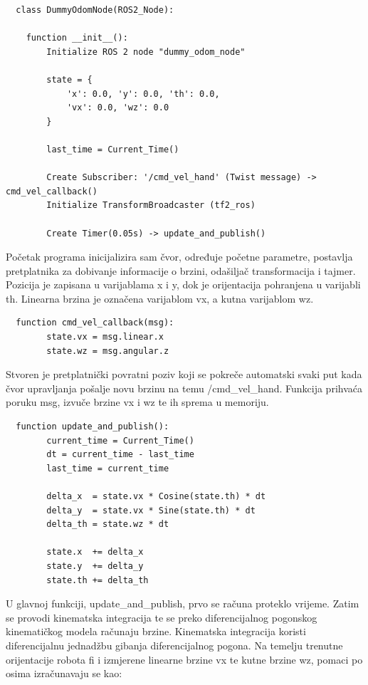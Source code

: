\documentclass[12pt,a4paper,oneside]{report}
\begin{document}
\begin{verbatim}
  class DummyOdomNode(ROS2_Node):

    function __init__():
        Initialize ROS 2 node "dummy_odom_node"

        state = {
            'x': 0.0, 'y': 0.0, 'th': 0.0,
            'vx': 0.0, 'wz': 0.0
        }

        last_time = Current_Time()

        Create Subscriber: '/cmd_vel_hand' (Twist message) -> cmd_vel_callback()
        Initialize TransformBroadcaster (tf2_ros)

        Create Timer(0.05s) -> update_and_publish()
\end{verbatim}

Početak programa inicijalizira sam čvor, određuje početne parametre, postavlja pretplatnika za dobivanje 
informacije o brzini, odašiljač transformacija i tajmer. Pozicija je zapisana u varijablama x i y, dok je 
orijentacija pohranjena u varijabli th. Linearna brzina je označena varijablom vx, a kutna varijablom wz.

\begin{verbatim}
  function cmd_vel_callback(msg):
        state.vx = msg.linear.x
        state.wz = msg.angular.z
\end{verbatim}

Stvoren je pretplatnički povratni poziv koji se pokreče automatski svaki put kada čvor upravljanja pošalje 
novu brzinu na temu /cmd\_vel\_hand. Funkcija prihvaća poruku msg, izvuče brzine vx i wz te ih sprema u memoriju. 

\begin{verbatim}
  function update_and_publish():
        current_time = Current_Time()
        dt = current_time - last_time
        last_time = current_time

        delta_x  = state.vx * Cosine(state.th) * dt
        delta_y  = state.vx * Sine(state.th) * dt
        delta_th = state.wz * dt

        state.x  += delta_x
        state.y  += delta_y
        state.th += delta_th
\end{verbatim}

U glavnoj funkciji, update\_and\_publish, prvo se računa proteklo vrijeme. Zatim se provodi kinematska 
integracija te se preko diferencijalnog pogonskog kinematičkog modela računaju brzine. 
Kinematska integracija koristi diferencijalnu jednadžbu gibanja diferencijalnog pogona. Na temelju trenutne 
orijentacije robota fi i izmjerene linearne brzine vx te kutne brzine wz, pomaci po osima izračunavaju se kao:
\end{document}
